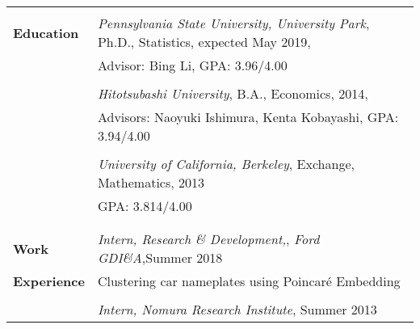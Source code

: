 \documentclass[utf8,letterpaper,oneside]{article}
\begin{document}
\begin{center}
 \begin{tabular}{l l}
  \hline
                         &                                                                                                       \\
  \textbf{Education}     & \textit{Pennsylvania State University, University Park}, Ph.D., Statistics, expected May 2019,        \\
                         & Advisor: Bing Li, GPA: 3.96/4.00                                                                      \\
                         &                                                                                                       \\
                         & \textit{Hitotsubashi University}, B.A., Economics, 2014,                                              \\
                         & Advisors: Naoyuki Ishimura, Kenta Kobayashi, GPA: 3.94/4.00                                           \\
                         &                                                                                                       \\
                         & \textit{University of California, Berkeley}, Exchange, Mathematics, 2013                              \\
                         & GPA: 3.814/4.00                                                                                       \\
                         &                                                                                                       \\ \hline
                         &                                                                                                       \\
  \textbf{Work}          & \textit{Intern, Research \& Development,}, \textit{Ford GDI\&A},Summer 2018                           \\
  \textbf{Experience}    & Clustering car nameplates using Poincar\'e Embedding                                                  \\
                         &                                                                                                       \\
                         & \textit{Intern, Nomura Research Institute}, Summer 2013                                               \\

\end{tabular}
\end{center}
\end{document}
